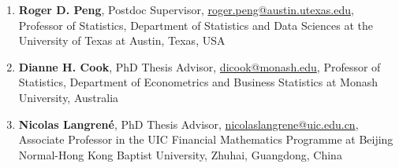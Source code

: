 \documentclass[10pt,a4paper]{article} %
\begin{document}
\begin{enumerate}[itemsep=0.1em]

    \item \textbf{Roger D. Peng}, Postdoc Supervisor, \href{mailto:roger.peng@austin.utexas.edu}{roger.peng@austin.utexas.edu}, Professor of Statistics, Department of Statistics and Data Sciences at the University of Texas at Austin, Texas, USA
    \item \textbf{Dianne H. Cook}, PhD Thesis Advisor, \href{mailto:dicook@monash.edu}{dicook@monash.edu}, Professor of Statistics, Department of Econometrics and Business Statistics at Monash University, Australia
      \item \textbf{Nicolas Langrené}, PhD Thesis Advisor, \href{mailto:nicolaslangrene@uic.edu.cn}{nicolaslangrene@uic.edu.cn}, Associate Professor in the UIC Financial Mathematics Programme at Beijing Normal-Hong Kong Baptist University, Zhuhai, Guangdong, China
    


\end{enumerate}
\end{document}
